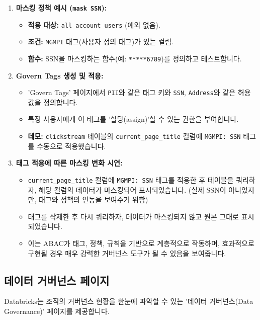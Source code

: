 \documentclass[11pt,a4paper]{article}
\begin{document}
\begin{enumerate}
\begin{itemize}
    \end{itemize}
    \item \textbf{마스킹 정책 예시 (\texttt{mask SSN}):}
    \begin{itemize}
        \item \textbf{적용 대상:} \texttt{all account users} (예외 없음).
        \item \textbf{조건:} \texttt{MGMPI} 태그(사용자 정의 태그)가 있는 컬럼.
        \item \textbf{함수:} SSN을 마스킹하는 함수(예: \texttt{*****6789})를 정의하고 테스트합니다.
    \end{itemize}
    \item \textbf{Govern Tags 생성 및 적용:}
    \begin{itemize}
        \item 'Govern Tags' 페이지에서 \texttt{PII}와 같은 태그 키와 \texttt{SSN}, \texttt{Address}와 같은 허용 값을 정의합니다.
        \item 특정 사용자에게 이 태그를 '할당(assign)'할 수 있는 권한을 부여합니다.
        \item \textbf{데모:} \texttt{clickstream} 테이블의 \texttt{current\_page\_title} 컬럼에 \texttt{MGMPI: SSN} 태그를 수동으로 적용했습니다.
    \end{itemize}
    \item \textbf{태그 적용에 따른 마스킹 변화 시연:}
    \begin{itemize}
        \item \texttt{current\_page\_title} 컬럼에 \texttt{MGMPI: SSN} 태그를 적용한 후 테이블을 쿼리하자, 해당 컬럼의 데이터가 마스킹되어 표시되었습니다. (실제 SSN이 아니었지만, 태그와 정책의 연동을 보여주기 위함)
        \item 태그를 삭제한 후 다시 쿼리하자, 데이터가 마스킹되지 않고 원본 그대로 표시되었습니다.
        \item 이는 ABAC가 태그, 정책, 규칙을 기반으로 계층적으로 작동하며, 효과적으로 구현될 경우 매우 강력한 거버넌스 도구가 될 수 있음을 보여줍니다.
    \end{itemize}
\end{enumerate}

\subsection*{데이터 거버넌스 페이지}

Databricks는 조직의 거버넌스 현황을 한눈에 파악할 수 있는 '데이터 거버넌스(Data Governance)' 페이지를 제공합니다.
\end{document}
